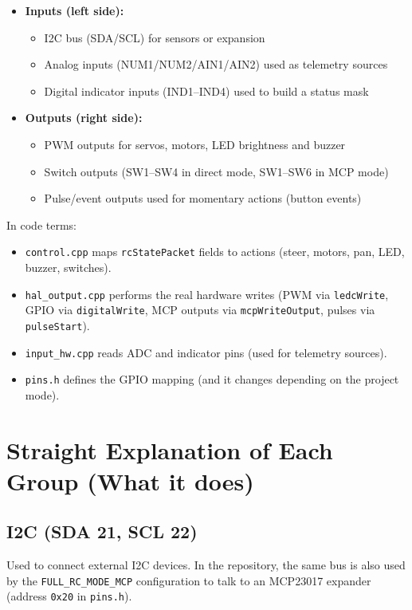 \begin{itemize}
    \item \textbf{Inputs (left side):}
    \begin{itemize}
        \item I2C bus (SDA/SCL) for sensors or expansion
        \item Analog inputs (NUM1/NUM2/AIN1/AIN2) used as telemetry sources
        \item Digital indicator inputs (IND1--IND4) used to build a status mask
    \end{itemize}
    \item \textbf{Outputs (right side):}
    \begin{itemize}
        \item PWM outputs for servos, motors, LED brightness and buzzer
        \item Switch outputs (SW1--SW4 in direct mode, SW1--SW6 in MCP mode)
        \item Pulse/event outputs used for momentary actions (button events)
    \end{itemize}
\end{itemize}

\noindent In code terms:
\begin{itemize}
    \item \texttt{control.cpp} maps \texttt{rcStatePacket} fields to actions (steer, motors, pan, LED, buzzer, switches).
    \item \texttt{hal\_output.cpp} performs the real hardware writes (PWM via \texttt{ledcWrite}, GPIO via \texttt{digitalWrite},
    MCP outputs via \texttt{mcpWriteOutput}, pulses via \texttt{pulseStart}).
    \item \texttt{input\_hw.cpp} reads ADC and indicator pins (used for telemetry sources).
    \item \texttt{pins.h} defines the GPIO mapping (and it changes depending on the project mode).
\end{itemize}

\section{Straight Explanation of Each Group (What it does)}
\label{sec:wiring-components}

\subsection{I2C (SDA 21, SCL 22)}
Used to connect external I2C devices. In the repository, the same bus is also used by the
\texttt{FULL\_RC\_MODE\_MCP} configuration to talk to an MCP23017 expander (address \texttt{0x20} in \texttt{pins.h}).

